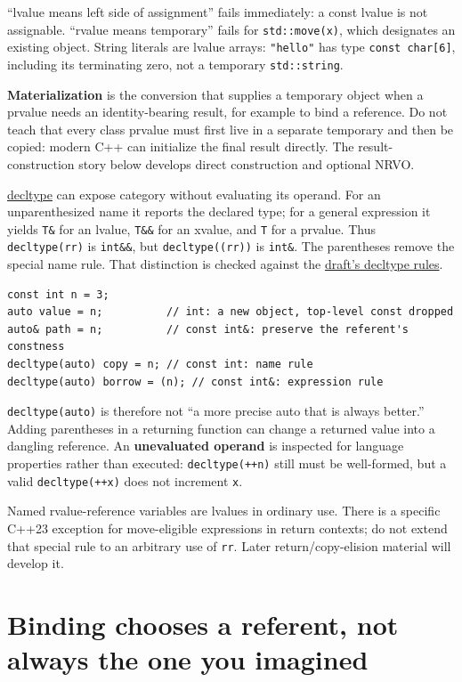 ``lvalue means left side of assignment'' fails immediately: a const lvalue is not assignable. ``rvalue means temporary'' fails for \texttt{std::move(x)}, which designates an existing object. String literals are lvalue arrays: \texttt{"hello"} has type \texttt{const\ char{[}6{]}}, including its terminating zero, not a temporary \texttt{std::string}.

\textbf{Materialization} is the conversion that supplies a temporary object when a prvalue needs an identity-bearing result, for example to bind a reference. Do not teach that every class prvalue must first live in a separate temporary and then be copied: modern C++ can initialize the final result directly. The result-construction story below develops direct construction and optional NRVO.

\hyperref[appendix-5d4252a42886]{decltype} can expose category without evaluating its operand. For an unparenthesized name it reports the declared type; for a general expression it yields \texttt{T\&} for an lvalue, \texttt{T\&\&} for an xvalue, and \texttt{T} for a prvalue. Thus \texttt{decltype(rr)} is \texttt{int\&\&}, but \texttt{decltype((rr))} is \texttt{int\&}. The parentheses remove the special name rule. That distinction is checked against the \href{https://eel.is/c++draft/dcl.type.decltype}{draft's decltype rules}.

\begin{verbatim}
const int n = 3;
auto value = n;          // int: a new object, top-level const dropped
auto& path = n;          // const int&: preserve the referent's constness
decltype(auto) copy = n; // const int: name rule
decltype(auto) borrow = (n); // const int&: expression rule
\end{verbatim}

\texttt{decltype(auto)} is therefore not ``a more precise auto that is always better.'' Adding parentheses in a returning function can change a returned value into a dangling reference. An \textbf{unevaluated operand} is inspected for language properties rather than executed: \texttt{decltype(++n)} still must be well-formed, but a valid \texttt{decltype(++x)} does not increment \texttt{x}.

Named rvalue-reference variables are lvalues in ordinary use. There is a specific C++23 exception for move-eligible expressions in return contexts; do not extend that special rule to an arbitrary use of \texttt{rr}. Later return/copy-elision material will develop it.

\section{Binding chooses a referent, not always the one you imagined}\label{01-foundations-i-ch003-binding-chooses-a-referent-not-always-the-one-you-imagined}

